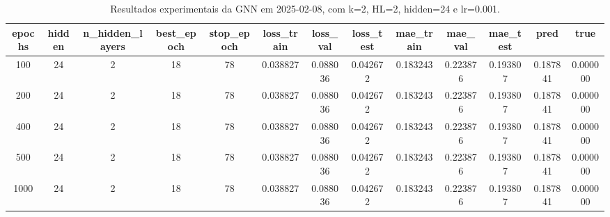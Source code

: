\begin{table}[h]
\centering
\caption{Resultados experimentais da GNN em 2025-02-08, com k=2, HL=2, hidden=24 e lr=0.001.}
\label{tab:gnn_results_k2_hl2_h24_d20250208}
\begin{tabular}{ccccccccccccc}
\toprule
epochs & hidden & n\_hidden\_layers & best\_epoch & stop\_epoch & loss\_train & loss\_val & loss\_test & mae\_train & mae\_val & mae\_test & pred & true \\
\midrule
100 & 24 & 2 & 18 & 78 & 0.038827 & 0.088036 & 0.042672 & 0.183243 & 0.223876 & 0.193807 & 0.187841 & 0.000000 \\
200 & 24 & 2 & 18 & 78 & 0.038827 & 0.088036 & 0.042672 & 0.183243 & 0.223876 & 0.193807 & 0.187841 & 0.000000 \\
400 & 24 & 2 & 18 & 78 & 0.038827 & 0.088036 & 0.042672 & 0.183243 & 0.223876 & 0.193807 & 0.187841 & 0.000000 \\
500 & 24 & 2 & 18 & 78 & 0.038827 & 0.088036 & 0.042672 & 0.183243 & 0.223876 & 0.193807 & 0.187841 & 0.000000 \\
1000 & 24 & 2 & 18 & 78 & 0.038827 & 0.088036 & 0.042672 & 0.183243 & 0.223876 & 0.193807 & 0.187841 & 0.000000 \\
\bottomrule
\end{tabular}
\end{table}
